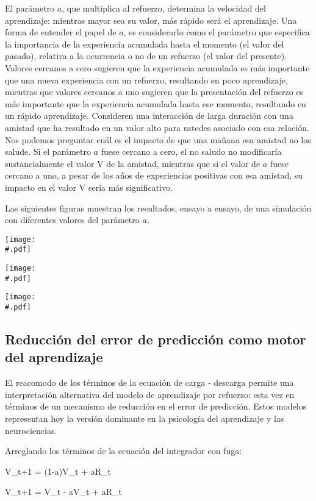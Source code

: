 \documentclass[
  a4paper,
  DIV=11,
  numbers=noendperiod]{scrreprt}
\begin{document}
El parámetro \(a\), que multiplica al refuerzo, determina la velocidad
del aprendizaje: mientras mayor sea su valor, más rápido será el
aprendizaje. Una forma de entender el papel de \(a\), es considerarlo
como el parámetro que especifica la importancia de la experiencia
acumulada hasta el momento (el valor del pasado), relativa a la
ocurrencia o no de un refuerzo (el valor del presente). Valores cercanos
a cero sugieren que la experiencia acumulada es más importante que una
nueva experiencia con un refuerzo, resultando en poco aprendizaje,
mientras que valores cercanos a uno sugieren que la presentación del
refuerzo es más importante que la experiencia acumulada hasta ese
momento, resultando en un rápido aprendizaje. Consideren una interacción
de larga duración con una amistad que ha resultado en un valor alto para
ustedes asociado con esa relación. Nos podemos preguntar cuál es el
impacto de que una mañana esa amistad no los salude. Si el parámetro
\(a\) fuese cercano a cero, el no saludo no modificaría sustancialmente
el valor V de la amistad, mientras que si el valor de \(a\) fuese
cercano a uno, a pesar de los años de experiencias positivas con esa
amistad, su impacto en el valor V sería más significativo.

Las siguientes figuras muestran los resultados, ensayo a ensayo, de una
simulación con diferentes valores del parámetro \(a\).

\texttt{[image: \\\#.pdf]}

\texttt{[image: \\\#.pdf]}

\texttt{[image: \\\#.pdf]}

\subsection{Reducción del error de predicción como motor del
aprendizaje}\label{reducciuxf3n-del-error-de-predicciuxf3n-como-motor-del-aprendizaje}

El reacomodo de los términos de la ecuación de carga - descarga permite
una interpretación alternativa del modelo de aprendizaje por refuerzo:
esta vez en términos de un mecanismo de reducción en el error de
predicción. Estos modelos representan hoy la versión dominante en la
psicología del aprendizaje y las neurociencias.

Arreglando los términos de la ecuación del integrador con fuga:

\(%
\)V\_t+1 = (1-a)V\_t + aR\_t\(%
\)

\(%
\)V\_t+1 = V\_t - aV\_t + aR\_t\(%
\)
\end{document}
